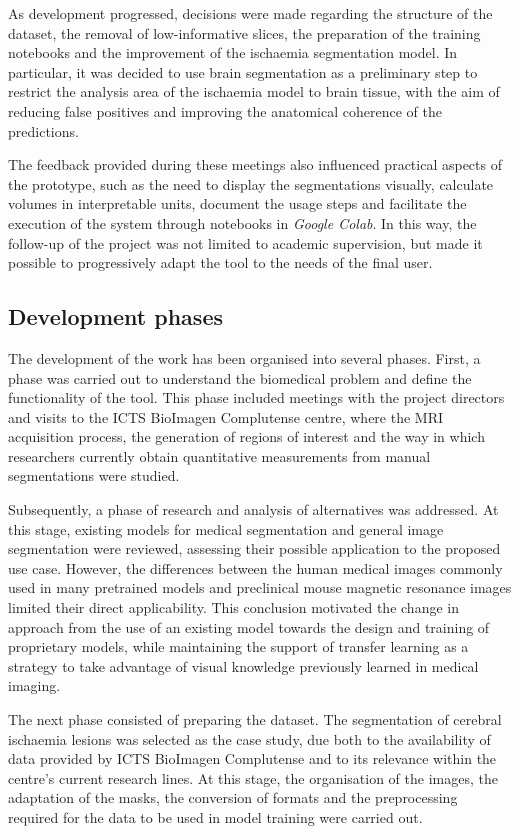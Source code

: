 As development progressed, decisions were made regarding the structure of the dataset, the removal of low-informative slices, the preparation of the training notebooks and the improvement of the ischaemia segmentation model. In particular, it was decided to use brain segmentation as a preliminary step to restrict the analysis area of the ischaemia model to brain tissue, with the aim of reducing false positives and improving the anatomical coherence of the predictions.

The feedback provided during these meetings also influenced practical aspects of the prototype, such as the need to display the segmentations visually, calculate volumes in interpretable units, document the usage steps and facilitate the execution of the system through notebooks in \textit{Google Colab}. In this way, the follow-up of the project was not limited to academic supervision, but made it possible to progressively adapt the tool to the needs of the final user.

\subsection*{Development phases}

The development of the work has been organised into several phases. First, a phase was carried out to understand the biomedical problem and define the functionality of the tool. This phase included meetings with the project directors and visits to the ICTS BioImagen Complutense centre, where the MRI acquisition process, the generation of regions of interest and the way in which researchers currently obtain quantitative measurements from manual segmentations were studied.

Subsequently, a phase of research and analysis of alternatives was addressed. At this stage, existing models for medical segmentation and general image segmentation were reviewed, assessing their possible application to the proposed use case. However, the differences between the human medical images commonly used in many pretrained models and preclinical mouse magnetic resonance images limited their direct applicability. This conclusion motivated the change in approach from the use of an existing model towards the design and training of proprietary models, while maintaining the support of transfer learning as a strategy to take advantage of visual knowledge previously learned in medical imaging.

The next phase consisted of preparing the dataset. The segmentation of cerebral ischaemia lesions was selected as the case study, due both to the availability of data provided by ICTS BioImagen Complutense and to its relevance within the centre's current research lines. At this stage, the organisation of the images, the adaptation of the masks, the conversion of formats and the preprocessing required for the data to be used in model training were carried out.

